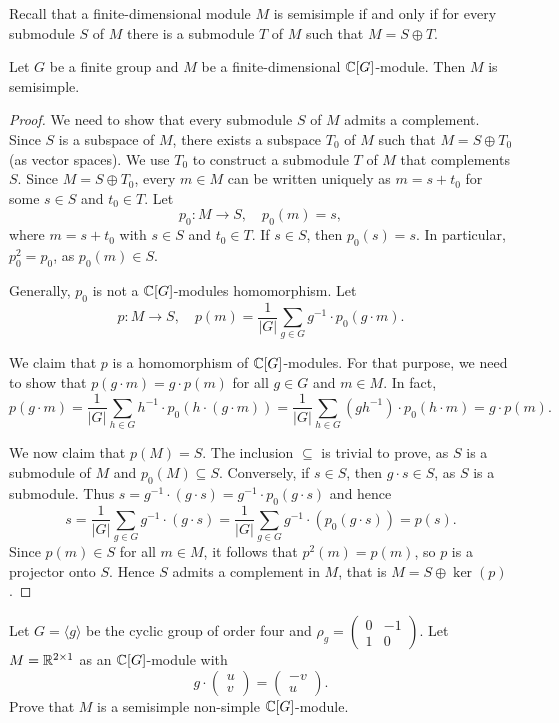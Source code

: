 Recall that a finite-dimensional module $M$ is semisimple 
if and only if for every submodule $S$ of $M$ there 
is a submodule $T$ of $M$ such that $M=S\oplus T$.    

\begin{theorem}[Maschke]
    Let $G$ be a finite
    group and $M$ be a finite-dimensional $\mathbb{C}[G]$-module.
    Then $M$ is semisimple. 
\end{theorem}

\begin{proof}
We need to show that every submodule $S$ of $M$ admits a complement. 
Since $S$ is a subspace of $M$, there exists a subspace $T_0$ of $M$ 
such that $M=S\oplus T_0$ (as vector spaces). We use 
$T_0$ to construct a submodule $T$ of $M$ that complements $S$. Since $M=S\oplus T_0$, 
every $m\in M$ can be written uniquely as $m=s+t_0$ for some $s\in S$ and $t_0\in T$. 
Let 
\[
p_0\colon M\to S,\quad
p_0(m)=s,
\]
where $m=s+t_0$ with $s\in S$ and $t_0\in T$. 
If $s\in S$, then $p_0(s)=s$. In particular, $p_0^2=p_0$, as 
$p_0(m)\in S$. 

Generally, $p_0$ is not a $\mathbb{C}[G]$-modules homomorphism. 
Let 
\[
p\colon M\to S,\quad
p(m)=\frac{1}{|G|}\sum_{g\in G}g^{-1}\cdot p_0(g\cdot m).
\]

We claim that $p$ is a homomorphism of $\mathbb{C}[G]$-modules. For that purpose, we need to show that 
$p(g\cdot m)=g\cdot p(m)$ for all $g\in G$ and $m\in M$. In fact, 
\[
p(g\cdot m)=\frac{1}{|G|}\sum_{h\in G}h^{-1}\cdot p_0(h\cdot (g\cdot m))
=\frac{1}{|G|}\sum_{h\in G}(gh^{-1})\cdot p_0(h\cdot m)=g\cdot p(m).
\]

We now claim that $p(M)=S$. The inclusion $\subseteq$ is trivial to prove, as $S$ is a submodule of $M$ 
and $p_0(M)\subseteq S$. Conversely, if $s\in S$, then $g\cdot s\in S$, as 
$S$ is a submodule. Thus 
$s=g^{-1}\cdot (g\cdot s)=g^{-1}\cdot p_0(g\cdot s)$ and hence 
\[
s=\frac{1}{|G|}\sum_{g\in G}g^{-1}\cdot (g\cdot s)=\frac{1}{|G|}\sum_{g\in G}g^{-1}\cdot (p_0(g\cdot s))=p(s).
\]
Since $p(m)\in S$ for all $m\in M$, it follows that $p^2(m)=p(m)$, so $p$ is a projector onto $S$. 
Hence $S$ admits a complement in $M$, that is $M=S\oplus\ker(p)$.
\end{proof}

\begin{exercise}
Let $G=\langle g\rangle$ be the cyclic group 
of order four and $\rho_g=\begin{pmatrix}
0&-1\\
1&0\end{pmatrix}$. 
Let $M=\mathbb{R}^{2\times 1}$ as an $\mathbb{C}[G]$-module with 
\[
g\cdot\begin{pmatrix}u\\v\end{pmatrix}
=\begin{pmatrix}-v\\u\end{pmatrix}.
\]
Prove that $M$ is a semisimple non-simple $\mathbb{C}[G]$-module.
\end{exercise}

